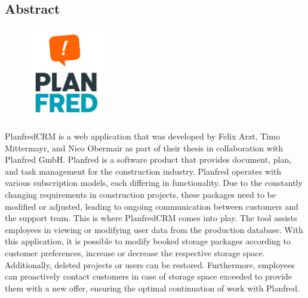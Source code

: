 \begin{spacing}{1}
    \chapter*{Abstract}
\end{spacing}
\begin{figure}
    \begin{center}
      \includegraphics[width=0.3\textwidth]{pics/PLANFRED-Logo-sq-bubble_sRGB.png}
    \end{center}
\end{figure}
PlanfredCRM is a web application that was developed by Felix Arzt, Timo Mittermayr, and Nico Obermair as part of their thesis in collaboration with Planfred GmbH. Planfred is a software product that provides document, plan, and task management for the construction industry. Planfred operates with various subscription models, each differing in functionality. Due to the constantly changing requirements in construction projects, these packages need to be modified or adjusted, leading to ongoing communication between customers and the support team. This is where PlanfredCRM comes into play. The tool assists employees in viewing or modifying user data from the production database. With this application, it is possible to modify booked storage packages according to customer preferences, increase or decrease the respective storage space. Additionally, deleted projects or users can be restored. Furthermore, employees can proactively contact customers in case of storage space exceeded to provide them with a new offer, ensuring the optimal continuation of work with Planfred.

